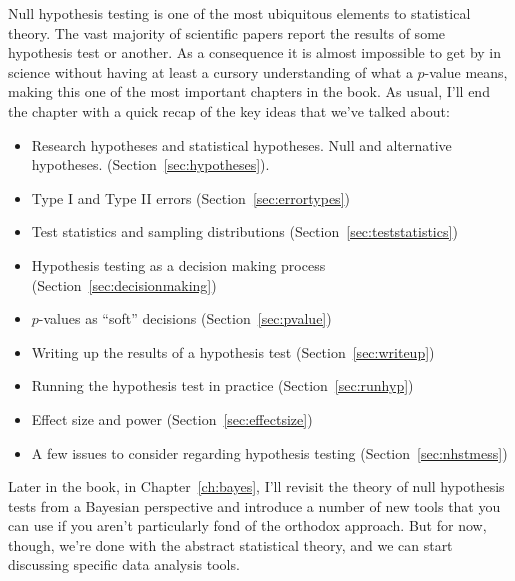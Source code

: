 Null hypothesis testing is one of the most ubiquitous elements to statistical theory. The vast majority of scientific papers report the results of some hypothesis test or another. As a consequence it is almost impossible to get by in science without having at least a cursory understanding of what a $p$-value means, making this one of the most important chapters in the book. As usual, I'll end the chapter with a quick recap of the key ideas that we've talked about:

\begin{itemize} \itemsep -2pt
\item Research hypotheses and statistical hypotheses. Null and alternative hypotheses. (Section~\ref{sec:hypotheses}).
\item Type I and Type II errors (Section~\ref{sec:errortypes})
\item Test statistics and sampling distributions (Section~\ref{sec:teststatistics})
\item Hypothesis testing as a decision making process (Section~\ref{sec:decisionmaking})
\item $p$-values as ``soft'' decisions (Section~\ref{sec:pvalue})
\item Writing up the results of a hypothesis test (Section~\ref{sec:writeup})
\item Running the hypothesis test in practice (Section~\ref{sec:runhyp})
\item Effect size and power (Section~\ref{sec:effectsize})
\item A few issues to consider regarding hypothesis testing (Section~\ref{sec:nhstmess})
\end{itemize}

\noindent
Later in the book, in Chapter~\ref{ch:bayes}, I'll revisit the theory of null hypothesis tests from a Bayesian perspective and introduce a number of new tools that you can use if you aren't particularly fond of the orthodox approach. But for now, though, we're done with the abstract statistical theory, and we can start discussing specific data analysis tools.


